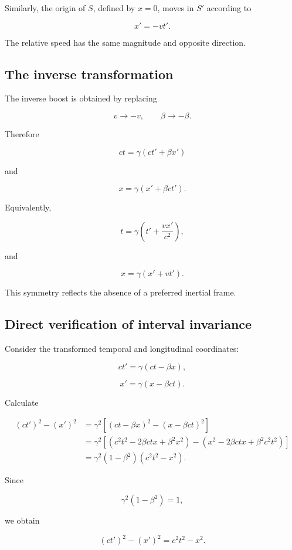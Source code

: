 Similarly, the origin of \(S\), defined by \(x=0\), moves in \(S'\) according to

\[
x'=-vt'.
\]

The relative speed has the same magnitude and opposite direction.

\subsection{The inverse transformation}

The inverse boost is obtained by replacing

\[
v\longrightarrow -v,
\qquad
\beta\longrightarrow -\beta.
\]

Therefore

\[
\boxed{
ct
=
\gamma(ct'+\beta x')
}
\]

and

\[
\boxed{
x
=
\gamma(x'+\beta ct')
}.
\]

Equivalently,

\[
t
=
\gamma\left(t'+
\frac{vx'}{c^{2}}
\right),
\]

and

\[
x
=
\gamma(x'+vt').
\]

This symmetry reflects the absence of a preferred inertial frame.

\subsection{Direct verification of interval invariance}

Consider the transformed temporal and longitudinal coordinates:

\[
ct'=\gamma(ct-\beta x),
\]

\[
x'=\gamma(x-\beta ct).
\]

Calculate

\[
\begin{aligned}
(ct')^{2}-(x')^{2}
&=
\gamma^{2}
\left[(ct-\beta x)^{2}
-(x-\beta ct)^{2}
\right]\\
&=
\gamma^{2}
\left[
(c^{2}t^{2}-2\beta ctx+\beta^{2}x^{2})
-(x^{2}-2\beta ctx+\beta^{2}c^{2}t^{2})
\right]\\
&=
\gamma^{2}(1-\beta^{2})
(c^{2}t^{2}-x^{2}).
\end{aligned}
\]

Since

\[
\gamma^{2}(1-\beta^{2})=1,
\]

we obtain

\[
(ct')^{2}-(x')^{2}
=
c^{2}t^{2}-x^{2}.
\]

